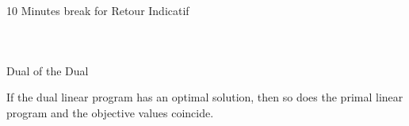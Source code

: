 \begin{frame}{}

  \begin{columns}
    \begin{column}{.5\textwidth}
      
    \end{column}
    \begin{column}{.5\textwidth}
      
    \end{column}       
  \end{columns}
\end{frame}


\begin{frame}{10 Minutes break for Retour Indicatif}

  \begin{columns}
    \begin{column}{.5\textwidth}
      \begin{displaymath}
 \end{displaymath}
    \end{column}
    \begin{column}{.5\textwidth}
      
    \end{column}       
  \end{columns}
\end{frame}






\begin{frame}{Dual of the Dual}

 \begin{corollary}
   \label{thr:5}
   If the dual linear program has an optimal solution, then so does the
   primal linear program and the objective values coincide.
 \end{corollary}

  \begin{columns}
    \begin{column}{.5\textwidth}
      
    \end{column}
    \begin{column}{.5\textwidth}
      
    \end{column}       
  \end{columns}
\end{frame}





